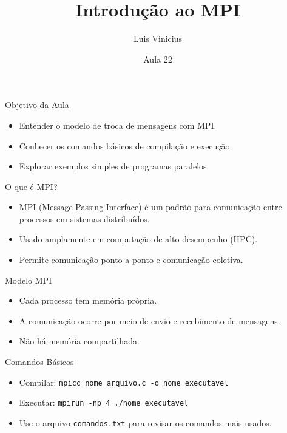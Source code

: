 \documentclass{beamer}
\title{Introdução ao MPI}
\author{Luis Vinicius}
\institute{UniAtenas — Clusterização de Servidores}
\date{Aula 22}
\begin{document}
\begin{frame}
    \titlepage
\end{frame}

\begin{frame}{Objetivo da Aula}
\begin{itemize}
    \item Entender o modelo de troca de mensagens com MPI.
    \item Conhecer os comandos básicos de compilação e execução.
    \item Explorar exemplos simples de programas paralelos.
\end{itemize}
\end{frame}

\begin{frame}{O que é MPI?}
\begin{itemize}
    \item MPI (Message Passing Interface) é um padrão para comunicação entre processos em sistemas distribuídos.
    \item Usado amplamente em computação de alto desempenho (HPC).
    \item Permite comunicação ponto-a-ponto e comunicação coletiva.
\end{itemize}
\end{frame}

\begin{frame}{Modelo MPI}
\begin{itemize}
    \item Cada processo tem memória própria.
    \item A comunicação ocorre por meio de envio e recebimento de mensagens.
    \item Não há memória compartilhada.
\end{itemize}
\end{frame}

\begin{frame}{Comandos Básicos}
\begin{itemize}
    \item Compilar: \texttt{mpicc nome\_arquivo.c -o nome\_executavel}
    \item Executar: \texttt{mpirun -np 4 ./nome\_executavel}
    \item Use o arquivo \texttt{comandos.txt} para revisar os comandos mais usados.
\end{itemize}
\end{frame}
\end{document}

